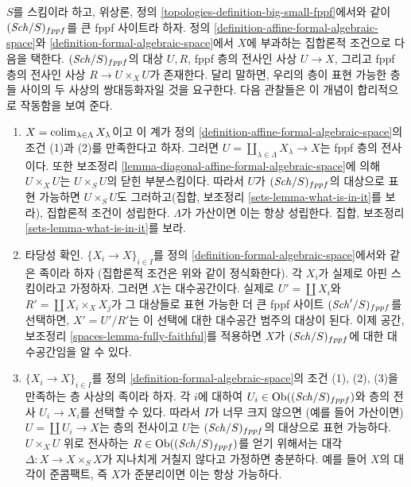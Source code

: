 \begin{remark}
\label{remark-set-theoretic}
$S$를 스킴이라 하고, 위상론, 정의
\ref{topologies-definition-big-small-fppf}에서와 같이
$(\mathit{Sch}/S)_{fppf}$를 큰 fppf 사이트라 하자. 정의
\ref{definition-affine-formal-algebraic-space}와
\ref{definition-formal-algebraic-space}에서 $X$에 부과하는
집합론적 조건으로 다음을 택한다. $(\mathit{Sch}/S)_{fppf}$의 대상
$U, R$, fppf 층의 전사인 사상 $U \to X$, 그리고 fppf 층의
전사인 사상 $R \to U \times_X U$가 존재한다. 달리 말하면,
우리의 층이 표현 가능한 층들 사이의 두 사상의 쌍대등화자일 것을
요구한다. 다음 관찰들은 이 개념이 합리적으로 작동함을 보여 준다.
\begin{enumerate}
\item $X = \mathop{\mathrm{colim}}\nolimits_{\lambda \in \Lambda} X_\lambda$이고 이 계가
정의 \ref{definition-affine-formal-algebraic-space}의 조건
(1)과 (2)를 만족한다고 하자. 그러면
$U = \coprod_{\lambda \in \Lambda} X_\lambda \to X$는 fppf 층의
전사이다. 또한 보조정리
\ref{lemma-diagonal-affine-formal-algebraic-space}에 의해
$U \times_X U$는 $U \times_S U$의 닫힌 부분스킴이다. 따라서
$U$가 $(\mathit{Sch}/S)_{fppf}$의 대상으로 표현 가능하면
$U \times_S U$도 그러하고(집합, 보조정리
\ref{sets-lemma-what-is-in-it}를 보라), 집합론적 조건이 성립한다.
$\Lambda$가 가산이면 이는 항상 성립한다. 집합, 보조정리
\ref{sets-lemma-what-is-in-it}를 보라.
\item 타당성 확인. $\{X_i \to X\}_{i \in I}$를 정의
\ref{definition-formal-algebraic-space}에서와 같은 족이라 하자
(집합론적 조건은 위와 같이 정식화한다). 각 $X_i$가 실제로 아핀
스킴이라고 가정하자. 그러면 $X$는 대수공간이다. 실제로
$U' = \coprod X_i$와 $R' = \coprod X_i \times_X X_j$가 그 대상들로
표현 가능한 더 큰 fppf 사이트 $(\mathit{Sch}'/S)_{fppf}$를 선택하면,
$X' = U'/R'$는 이 선택에 대한 대수공간 범주의 대상이 된다.
이제 공간, 보조정리 \ref{spaces-lemma-fully-faithful}를 적용하면
$X$가 $(\mathit{Sch}/S)_{fppf}$에 대한 대수공간임을 알 수 있다.
\item $\{X_i \to X\}_{i \in I}$를 정의
\ref{definition-formal-algebraic-space}의 조건 (1), (2), (3)을
만족하는 층 사상의 족이라 하자. 각 $i$에 대하여
$U_i \in \mathop{\mathrm{Ob}}\nolimits((\mathit{Sch}/S)_{fppf})$와 층의 전사
$U_i \to X_i$를 선택할 수 있다. 따라서 $I$가 너무 크지 않으면
(예를 들어 가산이면) $U = \coprod U_i \to X$는 층의 전사이고
$U$는 $(\mathit{Sch}/S)_{fppf}$의 대상으로 표현 가능하다.
$U \times_X U$ 위로 전사하는 $R \in \mathop{\mathrm{Ob}}\nolimits((\mathit{Sch}/S)_{fppf})$를 얻기
위해서는 대각 $\Delta : X \to X \times_S X$가 지나치게 거칠지
않다고 가정하면 충분하다. 예를 들어 $X$의 대각이 준콤팩트,
즉 $X$가 준분리이면 이는 항상 가능하다.
\end{enumerate}
\end{remark}

